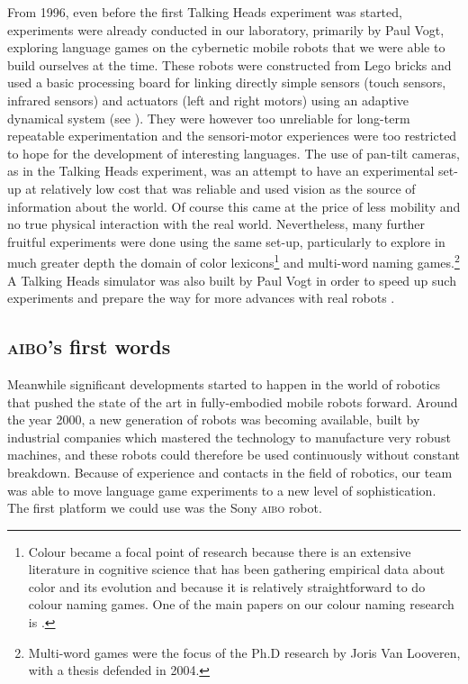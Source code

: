 From 1996, even before the first Talking Heads experiment was started, experiments were already conducted in our 
laboratory, primarily by Paul Vogt, exploring language games on the cybernetic mobile robots that we were able to build ourselves
at the time. These robots were constructed from Lego bricks and 
used a basic processing board for linking directly simple sensors (touch sensors, infrared sensors) and actuators (left and right motors)
using an adaptive dynamical system (see ). They were however too unreliable for long-term repeatable 
experimentation and the sensori-motor experiences were too restricted to hope for the development of interesting languages. The use 
of pan-tilt cameras, as in the Talking Heads experiment, was an attempt to 
have an experimental set-up at relatively low cost that was reliable and
used vision as the source of information about the world. Of course this came
at the price of less mobility and no true physical interaction with the real world. Nevertheless, many further fruitful experiments were 
done using the same set-up, particularly to explore in much greater depth the domain of color lexicons\footnote{Colour became a focal point of research because there is an extensive literature in cognitive science that has 
been gathering empirical data about color and its evolution and because it is relatively straightforward to do 
colour naming games. One of the main papers on our colour naming research is 
\cite{Steels:2005}.} and multi-word naming games.\footnote{Multi-word games were the focus of the Ph.D research by 
Joris Van Looveren, with a thesis defended in 2004.}
A Talking Heads simulator was also built by Paul Vogt in 
order to speed up such experiments and prepare the way for more advances with real robots \citep{Vogt:2003}.

\subsection{\textsc{aibo}'s first words}

Meanwhile significant developments started to happen in the world of robotics that pushed the state of 
the art in fully-embodied mobile robots forward.  
Around the year 2000, a new generation of robots was becoming available, built 
by industrial companies which mastered the technology to manufacture very robust machines, and these robots could therefore
be used continuously without constant breakdown. Because of experience and contacts in the field of
robotics, our team was able to move language game experiments to a new level of sophistication. The first 
platform we could use was the Sony \textsc{aibo} robot. 

